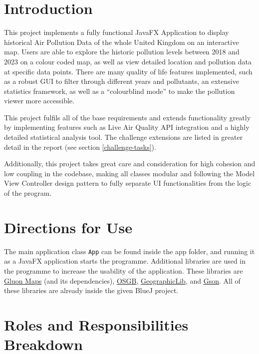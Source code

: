 \documentclass[10pt, a4paper]{scrartcl}
\begin{document}
\begin{multicols}{2}


\section{Introduction}

\noindent This project implements a fully functional JavaFX Application to display historical Air Pollution Data of the whole
United Kingdom on an interactive map. Users are able to explore the historic pollution levels between 2018 and 2023
on a colour coded map, as well as view detailed location and pollution data at specific data points. There are many
quality of life features implemented, such as a robust GUI to filter through different years and pollutants, an extensive 
statistics framework, as well as a “colourblind mode” to make the pollution viewer more accessible. 

\noindent This project fulfils all of the base requirements and extends functionality greatly by implementing features such as
Live Air Quality API integration and a highly detailed statistical analysis tool. The challenge extensions are
listed in greater detail in the report (see section \ref{challenge-tasks}).

\noindent Additionally, this project takes great care and consideration for high cohesion and low coupling in the codebase,
making all classes modular and following the Model View Controller design pattern to fully separate UI
functionalities from the logic of the program.

\section{Directions for Use}

\noindent The main application class \verb|App| can be found inside the app folder, and running it as a JavaFX application
starts the programme. Additional libraries are used in the programme to increase the usability of the application.
These libraries are \href{https://github.com/gluonhq/maps}{Gluon Maps} (and its dependencies),
\href{https://github.com/dstl/osgb}{OSGB}, \href{https://github.com/geographiclib/geographiclib-java}{GeographicLib},
and \href{https://github.com/google/gson}{Gson}.
All of these libraries are already inside the given BlueJ project.

\section{Roles and Responsibilities Breakdown}


\end{multicols}
\end{document}
